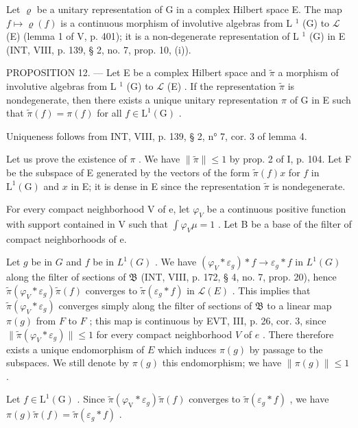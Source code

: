 Let \(\varrho\) be a unitary representation of G in a complex Hilbert space E. The map \(f\mapsto\varrho(f)\) is a continuous morphism of involutive algebras from L \(^{1}\) (G) to \(\mathcal{L}\) (E) (lemma 1 of V, p. 401); it is a non-degenerate representation of L \(^{1}\) (G) in E (INT, VIII, p. 139, § 2, no. 7, prop. 10, (i)).

PROPOSITION 12. --- Let E be a complex Hilbert space and \(\widetilde{\pi}\) a morphism of involutive algebras from L \(^{1}\) (G) to \(\mathcal{L}\) (E) . If the representation \(\widetilde{\pi}\) is nondegenerate, then there exists a unique unitary representation \(\pi\) of G in E such that \(\widetilde{\pi}(f)=\pi(f)\) for all \(f\in\mathrm{L}^{1}(\mathrm{G})\) .

Uniqueness follows from INT, VIII, p. 139, § 2, n° 7, cor. 3 of lemma 4.

Let us prove the existence of \(\pi\) . We have \(\| \widetilde{\pi}\| \leqslant 1\) by prop. 2 of I, p. 104. Let F be the subspace of E generated by the vectors of the form \(\widetilde{\pi}(f)x\) for \(f\) in \(\mathrm{L}^1 (\mathrm{G})\) and \(x\) in E; it is dense in E since the representation \(\widetilde{\pi}\) is nondegenerate.

For every compact neighborhood V of e, let \(\varphi_{V}\) be a continuous positive function with support contained in V such that \(\int\varphi_{V}\mu=1\) . Let B be a base of the filter of compact neighborhoods of e.

Let \(g\) be in \(G\) and \(f\) be in \(L^1(G)\) . We have \((\varphi_V * \varepsilon_g) * f \to \varepsilon_g * f\) in \(L^1(G)\) along the filter of sections of \(\mathfrak{B}\) (INT, VIII, p. 172, § 4, no. 7, prop. 20), hence \(\widetilde{\pi}(\varphi_V * \varepsilon_g)\widetilde{\pi}(f)\) converges to \(\widetilde{\pi}(\varepsilon_g * f)\) in \(\mathcal{L}(E)\) . This implies that \(\widetilde{\pi}(\varphi_V * \varepsilon_g)\) converges simply along the filter of sections of \(\mathfrak{B}\) to a linear map \(\pi(g)\) from \(F\) to \(F\) ; this map is continuous by EVT, III, p. 26, cor. 3, since \(\| \widetilde{\pi}(\varphi_V * \varepsilon_g) \| \leqslant 1\) for every compact neighborhood \(V\) of \(e\) . There therefore exists a unique endomorphism of \(E\) which induces \(\pi(g)\) by passage to the subspaces. We still denote by \(\pi(g)\) this endomorphism; we have \(\| \pi(g) \| \leqslant 1\) .

Let \(f \in \mathrm{L}^1(\mathrm{G})\) . Since \(\widetilde{\pi}(\varphi_{\mathrm{V}} * \varepsilon_g) \widetilde{\pi}(f)\) converges to \(\widetilde{\pi}(\varepsilon_g * f)\) , we have \(\pi(g) \widetilde{\pi}(f) = \widetilde{\pi}(\varepsilon_g * f)\) .

